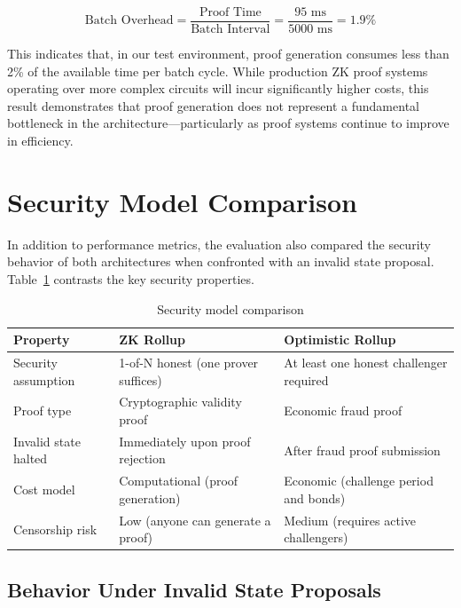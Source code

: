 \begin{equation}
\text{Batch Overhead} = \frac{\text{Proof Time}}{\text{Batch Interval}} = \frac{95 \text{ ms}}{5000 \text{ ms}} = 1.9\%
\end{equation}

This indicates that, in our test environment, proof generation consumes less than 2\% of the available time per batch cycle. While production ZK proof systems operating over more complex circuits will incur significantly higher costs, this result demonstrates that proof generation does not represent a fundamental bottleneck in the architecture---particularly as proof systems continue to improve in efficiency.

\section{Security Model Comparison}

In addition to performance metrics, the evaluation also compared the security behavior of both architectures when confronted with an invalid state proposal. Table~\ref{tab:security-models} contrasts the key security properties.

\begin{table}[h]
    \centering
    \begin{tabular}{l|p{4cm}|p{4cm}}
        \hline
        \textbf{Property} & \textbf{ZK Rollup} & \textbf{Optimistic Rollup} \\
        \hline
        Security assumption & 1-of-N honest (one prover suffices) & At least one honest challenger required \\
        \hline
        Proof type & Cryptographic validity proof & Economic fraud proof \\
        \hline
        Invalid state halted & Immediately upon proof rejection & After fraud proof submission \\
        \hline
        Cost model & Computational (proof generation) & Economic (challenge period and bonds) \\
        \hline
        Censorship risk & Low (anyone can generate a proof) & Medium (requires active challengers) \\
        \hline
    \end{tabular}
    \caption{Security model comparison}
    \label{tab:security-models}
\end{table}

\subsection{Behavior Under Invalid State Proposals}

